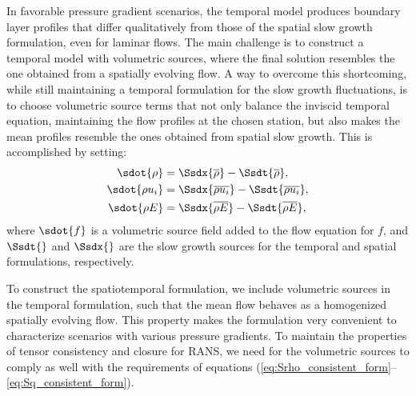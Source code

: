 {In favorable pressure gradient scenarios, the temporal model produces boundary
layer profiles that differ qualitatively from those of the spatial slow growth
formulation, even for laminar flows.
The main challenge is to construct a temporal model with volumetric sources,
where the final solution resembles the one obtained from a spatially
evolving flow.
A way to overcome this shortcoming, while still maintaining a temporal
formulation for the slow growth fluctuations, is to choose volumetric source
terms that not only balance the inviscid temporal equation, maintaining the
flow profiles at the chosen station, but also makes the mean profiles resemble
the ones obtained from spatial slow growth. This is accomplished by setting:
%
\begin{align}
\sdot{\rho} &= \Ssdx{\mean{\rho}} - \Ssdt{\mean{\rho}}, \\
\sdot{\rho u_i} &= \Ssdx{\mean{\rho u_i}} - \Ssdt{\mean{\rho u_i}}, \\
\sdot{\rho E} &= \Ssdx{\mean{\rho E}} - \Ssdt{\mean{\rho E}},
\end{align}
%
where $\sdot{f}$ is a volumetric source field added to the flow equation for
$f$, and $\Ssdt{}$ and $\Ssdx{}$ are the slow growth sources for the temporal
and spatial formulations, respectively.

To construct the spatiotemporal formulation, we include volumetric
sources in the temporal formulation, such that the mean flow behaves as a
homogenized spatially evolving flow. This property makes the formulation
very convenient to characterize scenarios with various pressure gradients.
To maintain the properties of tensor consistency and closure for RANS,
we need for the volumetric sources to comply as well with the requirements
of equations
(\ref{eq:Srho_consistent_form}--\ref{eq:Sq_consistent_form}).

}
